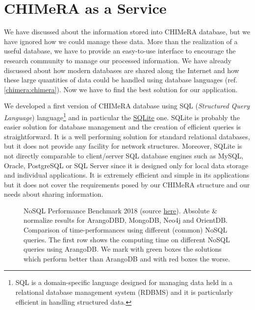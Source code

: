 \documentclass{standalone}
\begin{document}
\section[CHIMeRA as a Service]{CHIMeRA as a Service}\label{chimera:caas}

We have discussed about the information stored into \textsf{CHIMeRA} database, but we have ignored how we could manage these data.
More than the realization of a useful database, we have to provide an easy-to-use interface to encourage the research community to manage our processed information.
We have already discussed about how modern databases are shared along the Internet and how these large quantities of data could be handled using database languages (ref. \ref{chimera:chimera}).
Now we have to find the best solution for our application.

We developed a first version of \textsf{CHIMeRA} database using \textsf{SQL} (\emph{Structured Query Language}) language\footnote{
  \textsf{SQL} is a domain-specific language designed for managing data held in a relational database management system (RDBMS) and it is particularly efficient in handling structured data.

} and in particular the \href{https://www.sqlite.org/index.html}{\textsf{SQLite}} one.
\textsf{SQLite} is probably the easier solution for database management and the creation of efficient queries is straightforward.
It is a well performing solution for standard relational databases, but it does not provide any facility for network structures.
Moreover, \textsf{SQLite} is not directly comparable to client/server \textsf{SQL} database engines such as \textsf{MySQL}, \textsf{Oracle}, \textsf{PostgreSQL} or \textsf{SQL Server} since it is designed only for local data storage and individual applications.
It is extremely efficient and simple in its applications but it does not cover the requirements posed by our \textsf{CHIMeRA} structure and our needs about sharing information.

\begin{figure}[htbp]
\centering
\def\svgwidth{0.8\textwidth}

\caption{\textsf{NoSQL} Performance Benchmark 2018 (source \href{https://www.arangodb.com/2018/02/nosql-performance-benchmark-2018-mongodb-postgresql-orientdb-neo4j-arangodb/}{here}).
Absolute \& normalize results for \textsf{ArangoDBD}, \textsf{MongoDB}, \textsf{Neo4j} and \textsf{OrientDB}.
Comparison of time-performances using different (common) \textsf{NoSQL} queries.
The first row shows the computing time on different \textsf{NoSQL} queries using \textsf{ArangoDB}.
We mark with green boxes the solutions which perform better than \textsf{ArangoDB} and with red boxes the worse.
}
\label{fig:arango}
\end{figure}
\end{document}
